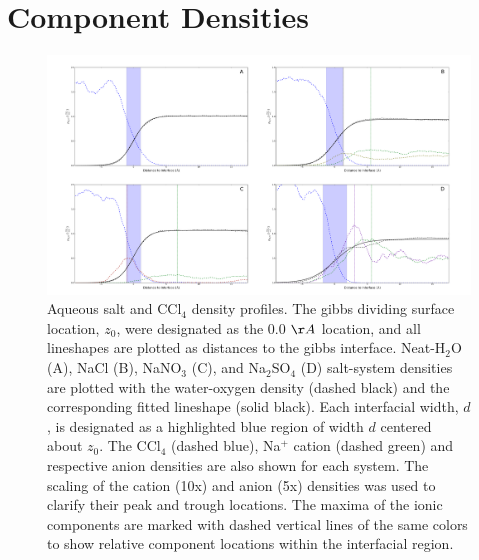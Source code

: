 \section{Component Densities}


\begin{figure}[h!]
\begin{center}
	\includegraphics[scale=0.16]{images/densities.png}
	\caption{Aqueous salt and CCl$_4$ density profiles. The gibbs dividing surface location, $z_0$, were designated as the 0.0 $\AA$ location, and all lineshapes are plotted as distances to the gibbs interface. Neat-H$_2$O (A), NaCl (B), NaNO$_3$ (C), and Na$_2$SO$_4$ (D) salt-system densities are plotted with the water-oxygen density (dashed black) and the corresponding fitted lineshape (solid black). Each interfacial width, $d$, is designated as a highlighted blue region of width $d$ centered about $z_0$. The CCl$_4$ (dashed blue), Na$^+$ cation (dashed green) and respective anion densities are also shown for each system. The scaling of the cation (10x) and anion (5x) densities was used to clarify their peak and trough locations. The maxima of the ionic components are marked with dashed vertical lines of the same colors to show relative component locations within the interfacial region.}
	\label{fig:density-plots}
\end{center}
\end{figure}

